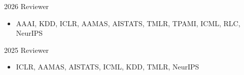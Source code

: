 \documentclass[10pt]{developercv} %
\begin{document}


\vspace{5 pt}

\begin{entrylist}
    \entry
        {2026}
        {Reviewer}
        {}
        {\vspace{-5pt}
        \begin{itemize}[noitemsep,topsep=0pt,parsep=2pt,partopsep=0pt, leftmargin=0pt]
            \item[] AAAI, KDD, ICLR, AAMAS, AISTATS, TMLR, TPAMI, ICML, RLC, NeurIPS
        \end{itemize}
        }
    \entry
        {2025}
        {Reviewer}
        {}
        {\vspace{-5pt}
        \begin{itemize}[noitemsep,topsep=0pt,parsep=2pt,partopsep=0pt, leftmargin=0pt]
            \item[] ICLR, AAMAS, AISTATS, ICML, KDD, TMLR, NeurIPS
        \end{itemize}
        }
\end{entrylist}
\end{document}
